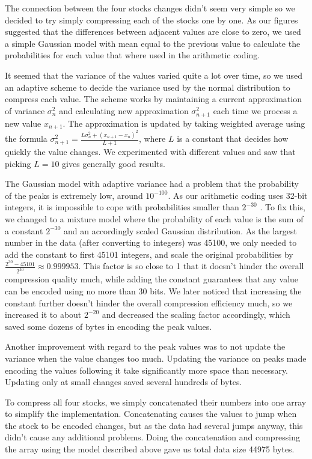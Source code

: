 \documentclass{article}
\begin{document}
The connection between the four stocks changes didn't seem very simple so we decided to try simply compressing each of the stocks one by one.
As our figures suggested that the differences between adjacent values are close to zero, we used a simple Gaussian model with mean equal to the previous value to calculate the probabilities for each value that where used in the arithmetic coding.

It seemed that the variance of the values varied quite a lot over time, so we used an adaptive scheme to decide the variance used by the normal distribution to compress each value.
The scheme works by maintaining a current approximation of variance $\sigma^2_n$ and calculating new approximation $\sigma^2_{n+1}$ each time we process a new value $x_{n+1}$.
The approximation is updated by taking weighted average using the formula $\sigma^2_{n+1} = \frac{L\sigma^2_n + (x_{n+1}-x_n)^2}{L+1}$, where $L$ is a constant that decides how quickly the value changes.
We experimented with different values and saw that picking $L=10$ gives generally good results.

The Gaussian model with adaptive variance had a problem that the probability of the peaks is extremely low, around $10^{-100}$.
As our arithmetic coding uses 32-bit integers, it is impossible to cope with probabilities smaller than $2^{-30}$ \cite{arith}.
To fix this, we changed to a mixture model where the probability of each value is the sum of a constant $2^{-30}$ and an accordingly scaled Gaussian distribution.
As the largest number in the data (after converting to integers) was 45100, we only needed to add the constant to first 45101 integers, and scale the original probabilities by $\frac{2^{30}-45101}{2^{30}} \approx 0.999953$.
This factor is so close to 1 that it doesn't hinder the overall compression quality much, while adding the constant guarantees that any value can be encoded using no more than 30 bits.
We later noticed that increasing the constant further doesn't hinder the overall compression efficiency much, so we increased it to about $2^{-20}$ and decreased the scaling factor accordingly, which saved some dozens of bytes in encoding the peak values.

Another improvement with regard to the peak values was to not update the variance when the value changes too much.
Updating the variance on peaks made encoding the values following it take significantly more space than necessary.
Updating only at small changes saved several hundreds of bytes.

To compress all four stocks, we simply concatenated their numbers into one array to simplify the implementation.
Concatenating causes the values to jump when the stock to be encoded changes, but as the data had several jumps anyway, this didn't cause any additional problems.
Doing the concatenation and compressing the array using the model described above gave us total data size 44975 bytes.
\end{document}
